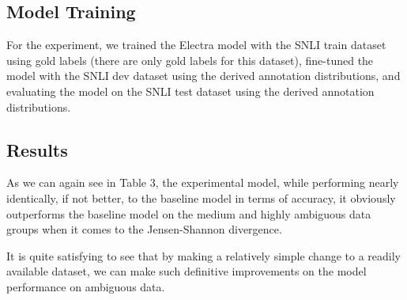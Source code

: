 \documentclass[11pt]{article}
\begin{document}
\subsection{Model Training}

For the experiment, we trained the Electra model with the SNLI train dataset using gold labels (there are only
gold labels for this dataset), fine-tuned the model with the SNLI dev dataset using the derived annotation
distributions, and evaluating the model on the SNLI test dataset using the derived annotation distributions.

\subsection{Results}

As we can again see in Table 3, the experimental model, while performing nearly identically, if not better, to
the baseline model in terms of accuracy, it obviously outperforms the baseline model on the medium and
highly ambiguous data groups when it comes to the Jensen-Shannon divergence.

It is quite satisfying to see that by making a relatively simple change to a readily available dataset, we can
make such definitive improvements on the model performance on ambiguous data.


\end{document}
